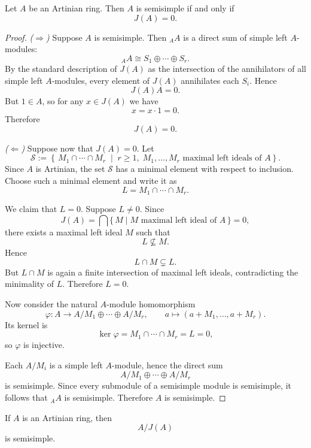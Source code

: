 \begin{theorem}
    Let $A$ be an Artinian ring. Then $A$ is semisimple if and only if
    \[
        J(A)=0.
    \]
\end{theorem}

\begin{proof}
    \noindent\emph{($\Rightarrow$)} Suppose $A$ is semisimple. Then ${}_AA$ is a direct sum of simple
    left $A$-modules:
    \[
        {}_AA \cong S_1\oplus \cdots \oplus S_r.
    \]
    By the standard description of $J(A)$ as the intersection of the annihilators of all simple
    left $A$-modules, every element of $J(A)$ annihilates each $S_i$. Hence
    \[
        J(A)A=0.
    \]
    But $1\in A$, so for any $x\in J(A)$ we have
    \[
        x=x\cdot 1=0.
    \]
    Therefore
    \[
        J(A)=0.
    \]

    \medskip

    \noindent\emph{($\Leftarrow$)} Suppose now that $J(A)=0$. Let
    \[
        \mathcal{S}:=\left\{\,M_1\cap \cdots \cap M_r \;\middle|\; r\ge 1,\; M_1,\dots,M_r
        \text{ maximal left ideals of }A \right\}.
    \]
    Since $A$ is Artinian, the set $\mathcal{S}$ has a minimal element with respect to inclusion.
    Choose such a minimal element and write it as
    \[
        L=M_1\cap \cdots \cap M_r.
    \]

    We claim that $L=0$. Suppose $L\neq 0$. Since
    \[
        J(A)=\bigcap\{\,M\mid M \text{ maximal left ideal of }A\,\}=0,
    \]
    there exists a maximal left ideal $M$ such that
    \[
        L\not\subseteq M.
    \]
    Hence
    \[
        L\cap M \subsetneq L.
    \]
    But $L\cap M$ is again a finite intersection of maximal left ideals, contradicting the minimality
    of $L$. Therefore $L=0$.

    Now consider the natural $A$-module homomorphism
    \[
        \varphi:A\longrightarrow A/M_1\oplus \cdots \oplus A/M_r,
        \qquad
        a\longmapsto (a+M_1,\dots,a+M_r).
    \]
    Its kernel is
    \[
        \ker\varphi=M_1\cap \cdots \cap M_r=L=0,
    \]
    so $\varphi$ is injective.

    Each $A/M_i$ is a simple left $A$-module, hence the direct sum
    \[
        A/M_1\oplus \cdots \oplus A/M_r
    \]
    is semisimple. Since every submodule of a semisimple module is semisimple, it follows that
    ${}_AA$ is semisimple. Therefore $A$ is semisimple.
\end{proof}

\begin{corollary}
    If $A$ is an Artinian ring, then
    \[
        A/J(A)
    \]
    is semisimple.
\end{corollary}

